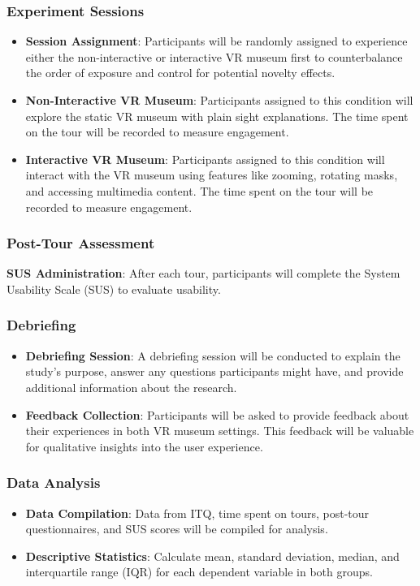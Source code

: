 \documentclass[conference]{IEEEtran}
\begin{document}
\subsubsection{Experiment Sessions}
\begin{itemize}
    \item \textbf{Session Assignment}: Participants will be randomly assigned to experience either the non-interactive or interactive VR museum first to counterbalance the order of exposure and control for potential novelty effects.
    \item \textbf{Non-Interactive VR Museum}: Participants assigned to this condition will explore the static VR museum with plain sight explanations. The time spent on the tour will be recorded to measure engagement.
    \item \textbf{Interactive VR Museum}: Participants assigned to this condition will interact with the VR museum using features like zooming, rotating masks, and accessing multimedia content. The time spent on the tour will be recorded to measure engagement.
\end{itemize}
\subsubsection{Post-Tour Assessment}
\begin{itemize}
\textbf{SUS Administration}: After each tour, participants will complete the System Usability Scale (SUS) to evaluate usability.
\end{itemize}
\subsubsection{Debriefing}
\begin{itemize}
    \item \textbf{Debriefing Session}: A debriefing session will be conducted to explain the study's purpose, answer any questions participants might have, and provide additional information about the research.
    \item \textbf{Feedback Collection}: Participants will be asked to provide feedback about their experiences in both VR museum settings. This feedback will be valuable for qualitative insights into the user experience.
\end{itemize}
\subsubsection{Data Analysis}
\begin{itemize}
    \item \textbf{Data Compilation}: Data from ITQ, time spent on tours, post-tour questionnaires, and SUS scores will be compiled for analysis.
    \item \textbf{Descriptive Statistics}: Calculate mean, standard deviation, median, and interquartile range (IQR) for each dependent variable in both groups.
\end{itemize}
\end{document}
